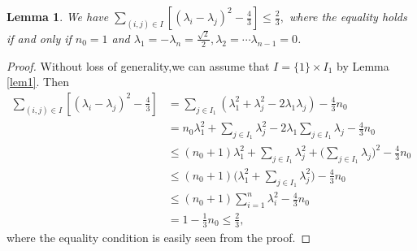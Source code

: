 \documentclass[a4paper,11pt]{amsart}
\numberwithin{equation}{section} \theoremstyle{plain}
\newtheorem{lem}[thm]{Lemma}
\begin{document}
\begin{lem}\label{lem2}
We have $\sum_{(i,j)\in I}[(\lambda_i-\lambda_j)^2-\frac4{3}]\leq\frac{2}3,$ where the equality holds 
if and only if $n_0=1$ and $\lambda_1=-\lambda_n=\frac{\sqrt{2}}2,\lambda_2=\cdots\lambda_{n-1}=0$.
\end{lem}
\begin{proof}
Without loss of generality,we can assume that $I=\{1\}\times I_1$ by Lemma \ref{lem1}. Then
$$
\begin{aligned}
\sum_{(i,j)\in I}[(\lambda_i-\lambda_j)^2-\frac43]&=\sum_{j\in I_1}(\lambda^2_1+\lambda^2_j-2\lambda_1\lambda_j)-\frac43n_0\\
                                                  &=n_0\lambda^2_1+\sum_{j\in I_1}\lambda^2_j-2\lambda_1\sum_{j\in I_1}\lambda_j-\frac43n_0\\
                                                  &\leq(n_0+1)\lambda^2_1+\sum_{j\in I_1}\lambda^2_j+\Big(\sum_{j\in I_1}\lambda_j\Big)^2-\frac43n_0\\
                                                  &\leq(n_0+1)\Big(\lambda^2_1+\sum_{j\in I_1}\lambda^2_j\Big)-\frac43n_0\\
                                                  &\leq(n_0+1)\sum^n_{i=1}\lambda^2_i-\frac43n_0\\
                                                  &=1-\frac13n_0\leq \frac23,
\end{aligned}
$$
where the equality condition is easily seen from the proof.
\end{proof}
\end{document}
